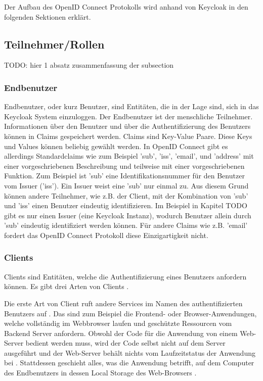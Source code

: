 Der Aufbau des OpenID Connect Protokolls wird anhand von Keycloak in den folgenden Sektionen erklärt.

\subsection{Teilnehmer/Rollen}

TODO: hier 1 absatz zusammenfassung der subsection

\subsubsection{Endbenutzer} \label{EB_End-Benutzer}

Endbenutzer, oder kurz Benutzer, sind Entitäten, die in der Lage sind, sich in das Keycloak System einzuloggen. Der Endbenutzer ist der menschliche Teilnehmer. Informationen über den Benutzer und über die Authentifizierung des Benutzers können in Claims gespeichert werden. Claims sind Key-Value Paare. Diese Keys und Values können beliebig gewählt werden. In OpenID Connect gibt es allerdings Standardclaims wie zum Beispiel 'sub', 'iss', 'email', und 'address' mit einer vorgeschriebenen Beschreibung und teilweise mit einer vorgeschriebenen Funktion. Zum Beispiel ist 'sub' eine Identifikationsnummer für den Benutzer vom Issuer ('iss'). Ein Issuer weist eine 'sub' nur einmal zu. Aus diesem Grund können andere Teilnehmer, wie z.B. der Client, mit der Kombination von 'sub' und 'iss' einen Benutzer eindeutig identifizieren. Im Beispiel in Kapitel TODO gibt es nur einen Issuer (eine Keycloak Instanz), wodurch Benutzer allein durch 'sub' eindeutig identifiziert werden können. Für andere Claims wie z.B. 'email' fordert das OpenID Connect Protokoll diese Einzigartigkeit nicht.

\subsubsection{Clients} \label{EB_Client}

Clients sind Entitäten, welche die Authentifizierung eines Benutzers anfordern können. Es gibt drei Arten von Clients \cite{OAuth2inAction}.

Die erste Art von Client ruft andere Services im Namen des authentifizierten Benutzers auf \cite{EB2} \cite{EB3}. Das sind zum Beispiel die Frontend- oder Browser-Anwendungen, welche vollständig im Webbrowser laufen und geschützte Ressourcen vom Backend Server anfordern. Obwohl der Code für die Anwendung von einem Web-Server bedient werden muss, wird der Code selbst nicht auf dem Server ausgeführt und der Web-Server behält nichts vom Laufzeitstatus der Anwendung bei \cite{OAuth2inAction}. Stattdessen geschieht alles, was die Anwendung betrifft, auf dem Computer des Endbenutzers in dessen Local Storage des Web-Browsers \cite{OAuth2inAction}.

